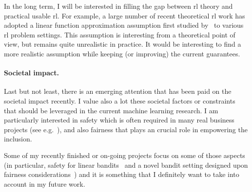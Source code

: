 In the long term, I will be interested in filling the gap between \gls{rl} theory and practical usable \gls{rl}. For example, a large number of recent theoretical \gls{rl} work has adopted a linear function approximation assumption first studied by~\cite{jin2019linear} to various \gls{rl} problem settings. This assumption is interesting from a theoretical point of view, but remains quite unrealistic in practice. It would be interesting to find a more realistic assumption while keeping (or improving) the current guarantees.

\paragraph{Societal impact.}
Last but not least, there is an emerging attention that has been paid on the societal impact recently. I value also a lot these societal factors or constraints that should be leveraged in the current machine learning research. I am particularly interested in safety which is often required in many real business projects (see e.g.~\citealt{garcelon2020attack,leurent2020robust}), and also fairness that plays an crucial role in empowering the inclusion.

Some of my recently finished or on-going projects focus on some of those aspects (in particular, safety for linear bandits~\citealt{shang2021safe} and a novel bandit setting designed upon fairness considerations~\citealt{shang2020vector}) and it is something that I definitely want to take into account in my future work.
